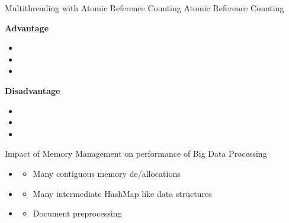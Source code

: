 \documentclass[9pt]{beamer}
\begin{document}

\begin{frame}[fragile]{Multithreading with Atomic Reference Counting}
    Atomic Reference Counting

    \vspace{0.5cm}
    \textbf{Advantage}
    \begin{itemize}
        \item {} 
        \item {}
        \item {}
    \end{itemize}

    \vspace{0.5cm}

    \textbf{Disadvantage}
    \begin{itemize}
        \item {} 
        \item {}
        \item {} 
    \end{itemize}

\end{frame}


\begin{frame}[fragile]{Impact of Memory Management on performance of Big Data Processing}

    \begin{itemize}
        \item {}
        \begin{itemize}
            \item Many contiguous memory de/allocations
        \end{itemize}
        \vspace{0.5cm}
        \item {}
        \begin{itemize}
            \item Many intermediate HashMap like data structures
        \end{itemize}
        \vspace{0.5cm}
        \item {}
        \begin{itemize}
            \item Document preprocessing 
        \end{itemize}    
    \end{itemize}

\end{frame}
\end{document}
